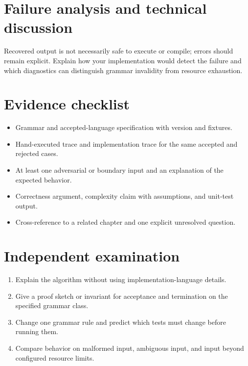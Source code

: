 \documentclass[11pt,letterpaper]{article}
\begin{document}
\section{Failure analysis and technical discussion}
Recovered output is not necessarily safe to execute or compile; errors should remain explicit. Explain how your implementation would detect the failure and which diagnostics can distinguish grammar invalidity from resource exhaustion.
\section{Evidence checklist}
\begin{itemize}
\item Grammar and accepted-language specification with version and fixtures.
\item Hand-executed trace and implementation trace for the same accepted and rejected cases.
\item At least one adversarial or boundary input and an explanation of the expected behavior.
\item Correctness argument, complexity claim with assumptions, and unit-test output.
\item Cross-reference to a related chapter and one explicit unresolved question.
\end{itemize}
\section{Independent examination}
\begin{enumerate}
\item Explain the algorithm without using implementation-language details.
\item Give a proof sketch or invariant for acceptance and termination on the specified grammar class.
\item Change one grammar rule and predict which tests must change before running them.
\item Compare behavior on malformed input, ambiguous input, and input beyond configured resource limits.
\end{enumerate}
\end{document}
